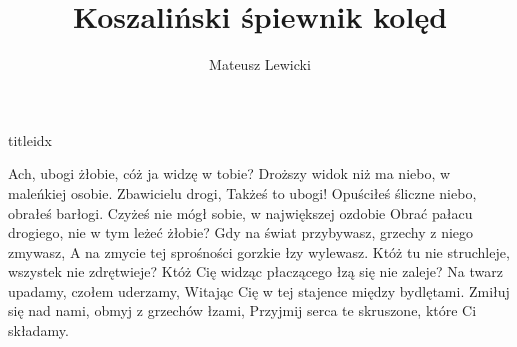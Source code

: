 \documentclass[a5paper, portrait, 12pt]{mwart}
\begin{document}
\author{Mateusz Lewicki}
\title{Koszaliński śpiewnik kolęd}
%

\begin{songs}{titleidx}


\beginverse
Ach, ubogi żłobie, cóż ja widzę w tobie?
Droższy widok niż ma niebo, w maleńkiej osobie.
\endverse
\beginverse
Zbawicielu drogi, Takżeś to ubogi!
Opuściłeś śliczne niebo, obrałeś barłogi.
\endverse
\beginverse
Czyżeś nie mógł sobie, w największej ozdobie Obrać 
pałacu drogiego, nie w tym leżeć żłobie?
\endverse
\beginverse
Gdy na świat przybywasz, grzechy z niego zmywasz,
A na zmycie tej sprośności gorzkie łzy wylewasz.
\endverse
\beginverse
Któż tu nie struchleje, wszystek nie zdrętwieje?
Któż Cię widząc płaczącego łzą się nie zaleje?
\endverse
\beginverse
Na twarz upadamy, czołem uderzamy,
Witając Cię w tej stajence między bydlętami.
\endverse
\beginverse
Zmiłuj się nad nami, obmyj z grzechów łzami,
Przyjmij serca te skruszone, które Ci składamy.
\endverse
\endsong



\end{songs}
\end{document}
